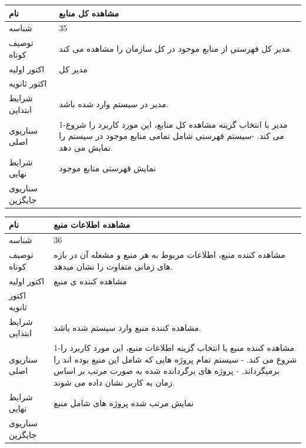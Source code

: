 \documentclass{article}
\begin{document}
\newpage

\begin{tabular}{|p{2cm}|p{10cm}|}
\hline
نام
&
مشاهده کل منابع
\\
\hline
شناسه
&
35
\\
\hline
توصیف کوتاه
&
مدیر کل فهرستی از منابع موجود در کل سازمان را مشاهده می کند.
\\
\hline
اکتور اولیه
&
مدیر کل
\\
\hline
اکتور ثانویه
&

\\
\hline
شرایط ابتدایی
&
مدیر در سیستم وارد شده باشد.
\\
\hline
سناریوی اصلی
&
1-مدیر با انتخاب گزینه مشاهده کل منابع، این مورد کاربرد را شروع می کند.
\newline
2-سیستم فهرستی شامل تمامی منابع موجود در سیستم را نمایش می دهد.
\\
\hline
شرایط نهایی
&
نمایش فهرستی منابع موجود
\\
\hline
سناریوی جایگزین
&

\\
\hline
\end{tabular}

\vspace{2cm}

\begin{tabular}{|p{2cm}|p{10cm}|}
\hline
نام
&
مشاهده اطلاعات منبع
\\
\hline
شناسه
&
36
\\
\hline
توصیف کوتاه
&
مشاهده کننده منبع، اطلاعات مربوط به هر منبع و مشغله آن در بازه های زمانی متفاوت را نشان میدهد.
\\
\hline
اکتور اولیه
&
مشاهده کننده ی منبع
\\
\hline
اکتور ثانویه
&

\\
\hline
شرایط ابتدایی
&
مشاهده کننده منبع وارد سیستم شده باشد.
\\
\hline
سناریوی اصلی
&
1-مشاهده کننده منبع با انتخاب گزینه اطلاعات منبع، این مورد کاربرد را شروع می کند.
\newline
2- سیستم تمام پروژه هایی که شامل این منبع بوده اند را برمیگرداند.
\newline
3- پروژه های برگردانده شده به صورت مرتب بر اساس زمان به کاربر نشان داده می شوند.
\\
\hline
شرایط نهایی
&
نمایش مرتب شده پروژه های شامل منبع
\\
\hline
سناریوی جایگزین
&

\\
\hline
\end{tabular}
\end{document}
